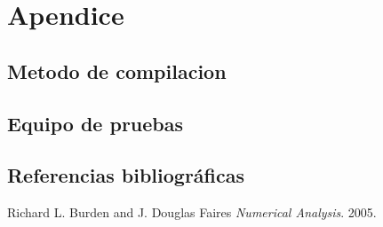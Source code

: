 \section{Apendice}
\subsection{Metodo de compilacion}
\subsection{Equipo de pruebas}
\subsection{Referencias bibliogr\'aficas}
\begin{thebibliography}{9}

  Richard L. Burden and J. Douglas Faires
  \emph{Numerical Analysis}.
  2005.
\end{thebibliography}
